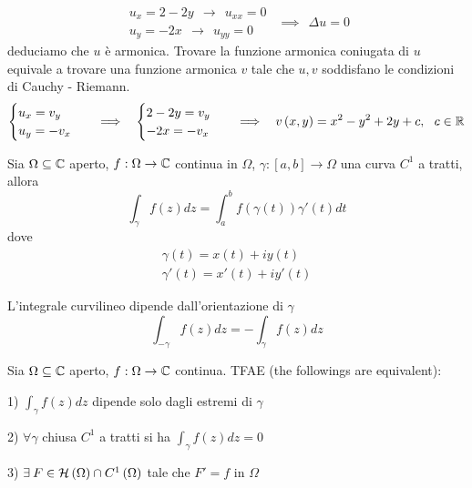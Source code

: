 \begin{equation*}
\begin{array}{ r }
u_{x} = 2 - 2y\ \ \rightarrow \ \ u_{xx} = 0\\
u_{y} = - 2x\ \ \rightarrow \ \ u_{yy} = 0
\end{array} \ \ \implies \ \ \Delta u = 0
\end{equation*}
deduciamo che $u$ è armonica. Trovare la funzione armonica coniugata di $u$ equivale a trovare una funzione armonica $v$ tale che $u,v$ soddisfano le condizioni di Cauchy - Riemann.
\begin{equation*}
\begin{cases}
u_{x} = v_{y}\\
u_{y} = - v_{x}
\end{cases} \ \ \implies \ \ 
\begin{cases}
2 - 2y = v_{y}\\
- 2x = -v_{x}
\end{cases} \ \ \implies \ \ v\left(x,y\right) = x^{2} - y^{2} + 2y + c,\ \ c\in \RR 
\end{equation*}
\Soluzione
\begin{defn}
Sia $\Omega \subseteq \mathbb{C} $ aperto, $f:\Omega \rightarrow \mathbb{C} $ continua in $\Omega $, $\gamma :\left[ a,b\right]\rightarrow \Omega $ una curva $C^{1}$ a tratti, allora
\begin{equation*}
\int\nolimits _{\gamma } f\left(z\right) dz = \int\nolimits ^{b}_{a} f\left(\gamma \left(t\right)\right) \gamma '\left(t\right) dt
\end{equation*}
dove
\begin{gather*}
\gamma \left(t\right) = x\left(t\right) + iy\left(t\right)\\
\gamma '\left(t\right) = x'\left(t\right) + iy'\left(t\right)
\end{gather*}
\end{defn}
\begin{rem}
L'integrale curvilineo dipende dall'orientazione di $\gamma $
\begin{equation*}
\int\nolimits _{ - \gamma } f\left(z\right) dz = -\int\nolimits _{\gamma } f\left(z\right) dz
\end{equation*}
\end{rem}
\begin{thm}
Sia $\Omega \subseteq \mathbb{C} $ aperto, $f:\Omega \rightarrow \mathbb{C} $ continua. TFAE (the followings are equivalent):

1) $\int _{\gamma } f\left(z\right) dz$ dipende solo dagli estremi di $\gamma $

2) $\forall \gamma $ chiusa $C^{1}$ a tratti si ha $\int _{\gamma } f\left(z\right) dz = 0$

3) $\exists F\in \Hc \left(\Omega \right) \cap C^{1}\left(\Omega \right)$ tale che $F' = f$ in $\Omega $
\end{thm}
